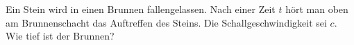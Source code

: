 \begin{Exercise}[label = Brunnen, origin = {Maximilian Marienhagen}, title = Brunnen, difficulty = 2]
Ein Stein wird in einen Brunnen fallengelassen. Nach einer Zeit $t$ hört man oben am Brunnenschacht das Auftreffen des Steins. Die Schallgeschwindigkeit sei $c$.\\
Wie tief ist der Brunnen?
\end{Exercise}
